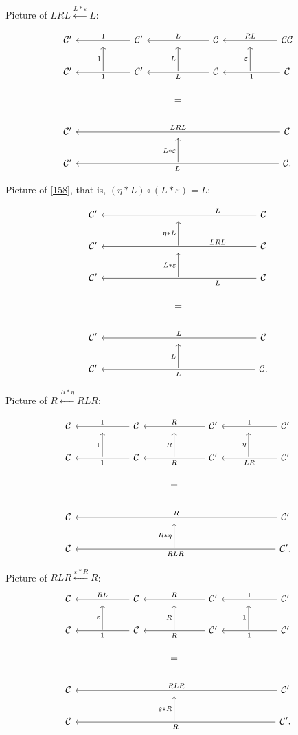 \documentclass[12pt]{article}%
\theoremstyle{remark}
\theoremstyle{definition}
\newcommand{\C}{\mathcal C}
\newcommand{\ee}{\varepsilon}
\begin{document}
Picture of $LRL\xleftarrow{L*\ee}L$:
 
$$
\begin{tikzcd}
%
\C'&{}&\C'\ar{ll}{}[swap]{1}&{}&\C\ar{ll}{}[swap]{L}&{}&\C\C\ar{ll}{}[swap]{RL}\\ 
%
\C'&\ar{u}{1}&\C'\ar{ll}{}{1}&\ar{u}{L}&\C\ar{ll}{}{L}&\ar{u}{\ee}&\C\ar{ll}{}{1}\\ 
%
&&&=\\ 
%
\C'&&&{}&&&\C\ar{llllll}[swap]{LRL}\\
%
\C'&&&\ar{u}{L*\ee}&&&\C\ar{llllll}{L}.
%
\end{tikzcd}
$$ 

Picture of \eqref{158}, that is, $(\eta*L)\circ(L*\ee)=L$:

$$
\begin{tikzcd}
%
\C'&&&{}&&&\C\ar{llllll}[near start,swap]{L}\\
%
\C'&&&\ar{u}{\eta*L}&&&\C\ar{llllll}[near start,swap]{LRL}\\
%
\C'&&&\ar{u}{L*\ee}&&&\C\ar{llllll}[near start]{L}\\ 
%
&&&=\\ 
%
\C'&&&{}&&&\C\ar{llllll}[swap]{L}\\ 
%
\C'&&&\ar{u}{L}&&&\C.\ar{llllll}{L}
%
\end{tikzcd}
$$ 

Picture of $R\xleftarrow{R*\eta}RLR$:
 
$$
\begin{tikzcd}
%
\C&{}&\C\ar{ll}{}[swap]{1}&{}&\C'\ar{ll}{}[swap]{R}&{}&\C'\ar{ll}{}[swap]{1}\\ 
%
\C&\ar{u}{1}&\C\ar{ll}{}{1}&\ar{u}{R}&\C'\ar{ll}{}{R}&\ar{u}{\eta}&\C'\ar{ll}{}{LR}\\ 
%
&&&=\\ 
%
\C&&&{}&&&\C'\ar{llllll}[swap]{R}\\
%
\C&&&\ar{u}{R*\eta}&&&\C'\ar{llllll}{RLR}.
%
\end{tikzcd}
$$ 

Picture of $RLR\xleftarrow{\ee*R}R$:
$$
\begin{tikzcd}
%
\C&{}&\C\ar{ll}{}[swap]{RL}&{}&\C'\ar{ll}{}[swap]{R}&{}&\C'\ar{ll}{}[swap]{1}\\ 
%
\C&\ar{u}{\ee}&\C\ar{ll}{}{1}&\ar{u}{R}&\C'\ar{ll}{}{R}&\ar{u}{1}&\C'\ar{ll}{}{1}\\ 
%
&&&=\\ 
%
\C&&&{}&&&\C'\ar{llllll}[swap]{RLR}\\
%
\C&&&\ar{u}{\ee*R}&&&\C'\ar{llllll}{R}.
%
\end{tikzcd}
$$ 
\end{document}
